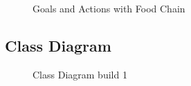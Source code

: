 \documentclass[11pt]{report}
\begin{document}
\begin{figure}[H]
    \centering
    \caption{Goals and Actions with Food Chain}
\end{figure}

\subsection{Class Diagram}

\begin{figure}[H]
    \centering
    \caption{Class Diagram build 1}
\end{figure}
\end{document}
